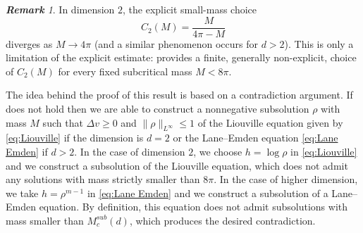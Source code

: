 \documentclass[11pt,a4paper]{article}
\numberwithin{equation}{section}
\theoremstyle{plain}
\theoremstyle{remark}
\newtheorem{remark}[theorem]{\bf Remark}
\begin{document}
\begin{remark}
In dimension $2$, the explicit small-mass choice
$$
C_2(M)=\frac{M}{4\pi-M}
$$
diverges as $M\to4\pi$ (and a similar phenomenon occurs for $d>2$). This is only a limitation of the
explicit estimate:  provides a finite,
generally non-explicit, choice of $C_2(M)$ for every fixed
subcritical mass $M<8\pi$.
\end{remark}

The idea behind the proof of this result is based on a contradiction argument. 
If  does not hold then we are able to construct a nonnegative subsolution $\rho$ with mass $M$ such that $\Delta v \geq 0$ and $\| \rho \|_{L^\infty} \leq 1$ of the Liouville equation given by \eqref{eq:Liouville} if the dimension is $d=2$ or the Lane--Emden equation \eqref{eq:Lane Emden} if $d>2$. In the case of dimension $2$, we choose $h  = \log \rho$ in \eqref{eq:Liouville} and we construct a subsolution of the Liouville equation, which does not admit any solutions with mass strictly smaller than $8 \pi$. In the case of higher dimension, we take $h = \rho^{m-1}$ in \eqref{eq:Lane Emden} and we construct a subsolution of a Lane--Emden equation. By definition, this equation does not admit subsolutions with mass smaller than $M^{sub}_c(d)$, which produces the desired contradiction.



\end{document}
